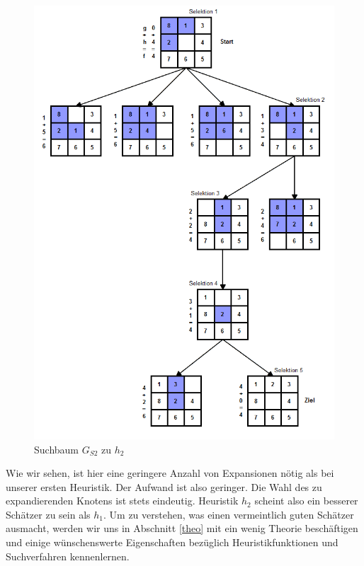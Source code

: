 \begin{figure}[p]
	\includegraphics[width=14cm]{chapters/informed_search/tree2.png}
	\caption{Suchbaum $G_{S2}$ zu $h_{2}$}
	\label{fig:figure2}
\end{figure}

Wie wir sehen, ist hier eine geringere Anzahl von Expansionen nötig als bei unserer ersten Heuristik. Der Aufwand ist also geringer. Die Wahl des zu expandierenden Knotens ist stets eindeutig. Heuristik $h_{2}$ scheint also ein besserer Schätzer zu sein als $h_{1}$. Um zu verstehen, was einen vermeintlich guten Schätzer ausmacht, werden wir uns in Abschnitt \ref{theo} mit ein wenig Theorie beschäftigen und einige wünschenswerte Eigenschaften bezüglich Heuristikfunktionen und Suchverfahren kennenlernen.


